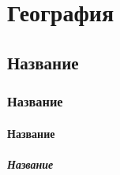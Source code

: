 \chapter*{География}
\section*{Название}
\subsection*{Название}
\subsubsection*{Название}
\paragraph{Название}
